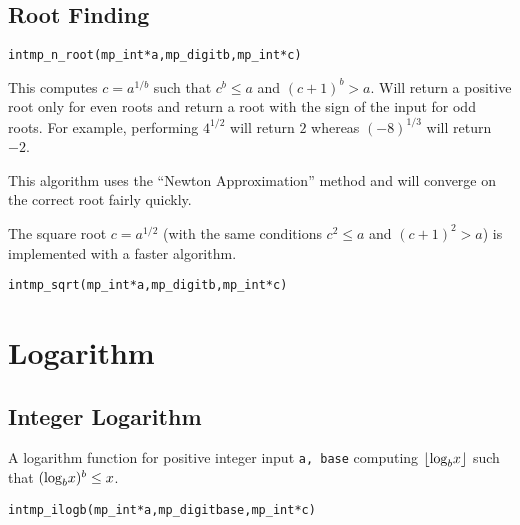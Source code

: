 \documentclass[synpaper]{book}
\def\log{{\rm log}}
\newcommand{\floor}[1]{\left\lfloor{#1}\right\rfloor}
\begin{document}
\section{Root Finding}
\begin{alltt}
int mp_n_root (mp_int * a, mp_digit b, mp_int * c)
\end{alltt}
This computes $c = a^{1/b}$ such that $c^b \le a$ and $(c+1)^b > a$. Will return a positive root only for even roots and return
a root with the sign of the input for odd roots.  For example, performing $4^{1/2}$ will return $2$ whereas $(-8)^{1/3}$
will return $-2$.

This algorithm uses the ``Newton Approximation'' method and will converge on the correct root fairly quickly.

The square root  $c = a^{1/2}$ (with the same conditions $c^2 \le a$ and $(c+1)^2 > a$) is implemented with a faster algorithm.

\begin{alltt}
int mp_sqrt (mp_int * a, mp_digit b, mp_int * c)
\end{alltt}


\chapter{Logarithm}
\section{Integer Logarithm}
A logarithm function for positive integer input \texttt{a, base} computing  $\floor{\log_bx}$ such that $(\log_b x)^b \le x$.
\begin{alltt}
int mp_ilogb(mp_int *a, mp_digit base, mp_int *c)
\end{alltt}
\end{document}
